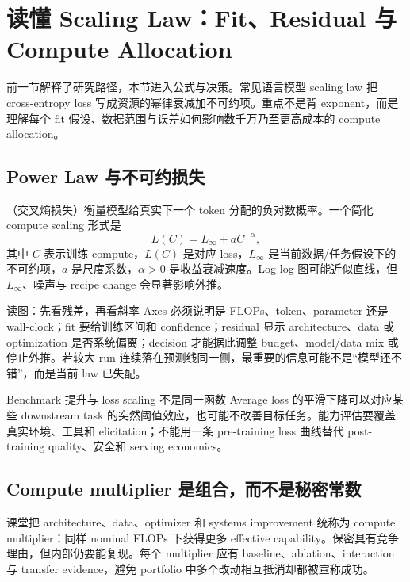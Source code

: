 \section{读懂 Scaling Law：Fit、Residual 与 Compute Allocation}

前一节解释了研究路径，本节进入公式与决策。常见语言模型 scaling law 把 cross-entropy loss 写成资源的幂律衰减加不可约项。重点不是背 exponent，而是理解每个 fit 假设、数据范围与误差如何影响数千万乃至更高成本的 compute allocation。

\subsection{Power Law 与不可约损失}

（交叉熵损失）衡量模型给真实下一个 token 分配的负对数概率。一个简化 compute scaling 形式是
\[
L(C)=L_{\infty}+aC^{-\alpha},
\]
其中 $C$ 表示训练 compute，$L(C)$ 是对应 loss，$L_{\infty}$ 是当前数据/任务假设下的不可约项，$a$ 是尺度系数，$\alpha>0$ 是收益衰减速度。Log-log 图可能近似直线，但 $L_{\infty}$、噪声与 recipe change 会显著影响外推。


\begin{knowledgebox}{读图：先看残差，再看斜率}
Axes 必须说明是 FLOPs、token、parameter 还是 wall-clock；fit 要给训练区间和 confidence；residual 显示 architecture、data 或 optimization 是否系统偏离；decision 才能据此调整 budget、model/data mix 或停止外推。若较大 run 连续落在预测线同一侧，最重要的信息可能不是“模型还不错”，而是当前 law 已失配。
\end{knowledgebox}

\begin{warningbox}{Benchmark 提升与 loss scaling 不是同一函数}
Average loss 的平滑下降可以对应某些 downstream task 的突然阈值效应，也可能不改善目标任务。能力评估要覆盖真实环境、工具和 elicitation；不能用一条 pre-training loss 曲线替代 post-training quality、安全和 serving economics。
\end{warningbox}

\subsection{Compute multiplier 是组合，而不是秘密常数}

课堂把 architecture、data、optimizer 和 systems improvement 统称为 compute multiplier：同样 nominal FLOPs 下获得更多 effective capability。保密具有竞争理由，但内部仍要能复现。每个 multiplier 应有 baseline、ablation、interaction 与 transfer evidence，避免 portfolio 中多个改动相互抵消却都被宣称成功。

